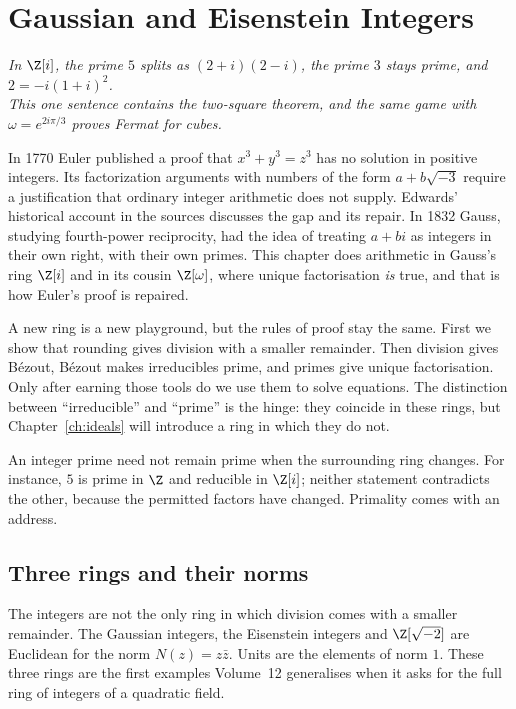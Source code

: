 \chapter{Gaussian and Eisenstein Integers}\label{ch:gaussian}

\begin{center}\itshape
In $\Z[i]$, the prime $5$ splits as $(2+i)(2-i)$, the prime $3$ stays prime, and $2=-i(1+i)^2$.\\
This one sentence contains the two-square theorem, and the same game with $\omega=e^{2i\pi/3}$ proves Fermat for cubes.
\end{center}

In 1770 Euler published a proof that $x^3+y^3=z^3$ has no solution in positive integers. Its factorization arguments with numbers of the form $a+b\sqrt{-3}$ require a justification that ordinary integer arithmetic does not supply. Edwards' historical account in the sources discusses the gap and its repair. In 1832 Gauss, studying fourth-power reciprocity,
had the idea of treating $a+bi$ as integers in their own right, with their own primes. This chapter does arithmetic in Gauss's ring $\Z[i]$ and in its
cousin $\Z[\omega]$, where unique factorisation \emph{is} true, and that is how Euler's proof is repaired.

\begin{reminder}
A new ring is a new playground, but the rules of proof stay the same. First we
show that rounding gives division with a smaller remainder. Then division gives
B\'ezout, B\'ezout makes irreducibles prime, and primes give unique factorisation.
Only after earning those tools do we use them to solve equations. The distinction
between ``irreducible'' and ``prime'' is the hinge: they coincide in these rings,
but Chapter~\ref{ch:ideals} will introduce a ring in which they do not.
\end{reminder}

An integer prime need not remain prime when the surrounding ring changes.
For instance, $5$ is prime in $\Z$ and reducible in $\Z[i]$; neither statement
contradicts the other, because the permitted factors have changed. Primality
comes with an address.

\section{Three rings and their norms}

The integers are not the only ring in which division comes with a smaller remainder. The Gaussian integers, the Eisenstein integers and $\Z[\sqrt{-2}]$ are Euclidean for the norm $N(z)=z\bar z$. Units are the elements of norm $1$. These three rings are the first examples Volume~12 generalises when it asks for the full ring of integers of a quadratic field.

